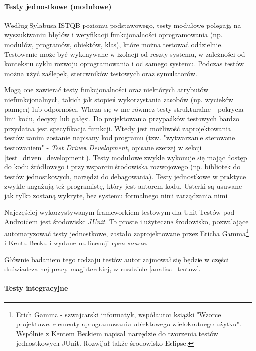 \paragraph{Testy jednostkowe (modułowe)}


Według Sylabusa ISTQB poziomu podstawowego\cite{bib:sylabus:foundation}, testy modułowe polegają na wyszukiwaniu błędów i weryfikacji funkcjonalności oprogramowania (np. modułów, programów, obiektów, klas), które można testować oddzielnie. Testowanie może być wykonywane w izolacji od reszty systemu, w zależności od kontekstu cyklu rozwoju oprogramowania i od samego systemu. Podczas testów można użyć zaślepek, sterowników testowych oraz symulatorów. 

Mogą one zawierać testy funkcjonalności oraz niektórych atrybutów niefunkcjonalnych, takich jak stopień wykorzystania zasobów (np. wycieków pamięci) lub odporności. Wlicza się w nie również testy strukturalne - pokrycia linii kodu, decyzji lub gałęzi. Do projektowania przypadków testowych bardzo przydatna jest specyfikacja fumkcji. Wtedy jest możliwość zaprojektowania testów zanim zostanie napisany kod programu (tzw. "wytwarzanie sterowane testowaniem" - \textit{Test Driven Development}, opisane szerzej w sekcji \ref{test_driven_development}). Testy modułowe zwykle wykonuje się mając dostęp do kodu źródłowego i przy wsparciu środowiska rozwojowego (np. bibliotek do testów jednostkowych, narzędzi do debagowania). Testy jednostkowe w praktyce zwykle angażują też programistę, który jest autorem kodu. Usterki są usuwane jak tylko zostaną wykryte, bez systemu formalnego nimi zarządzania nimi.

Najczęściej wykorzystywanym frameworkiem testowym dla Unit Testów pod Androidem jest środowisko \textit{JUnit}. To proste i użyteczne środowisko, pozwalające automatyzować testy jednostkowe, zostało zaprojektowane przez Ericha Gamma\footnote{Erich Gamma - szwajcarski informatyk, współautor książki "Wzorce projektowe: elementy oprogramowania obiektowego wielokrotnego użytku". Wspólnie z Kentem Beckiem napisał narzędzie do tworzenia testów jednostkowych JUnit. Rozwijał także środowisko Eclipse.} i Kenta Becka i wydane na licencji \textit{open source}.

Głównie badaniem tego rodzaju testów autor zajmował się będzie w części doświadczalnej pracy magisterskiej, w rozdziale \ref{analiza_testow}.

\paragraph{Testy integracyjne}

